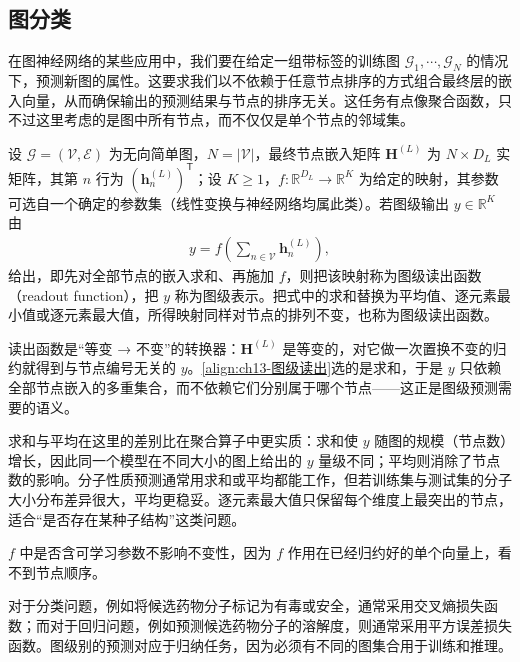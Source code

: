 \documentclass[../../main.tex]{subfiles}
\begin{document}
\subsection{图分类}\label{subsection:ch13-图分类}

在图神经网络的某些应用中，我们要在给定一组带标签的训练图 $\mathcal{G}_1,\cdots,\mathcal{G}_N$ 的情况下，预测新图的属性。这要求我们以不依赖于任意节点排序的方式组合最终层的嵌入向量，从而确保输出的预测结果与节点的排序无关。这任务有点像聚合函数，只不过这里考虑的是图中所有节点，而不仅仅是单个节点的邻域集。

\begin{definition}[图级读出函数]\label{definition:ch13-图级读出}
设 $\mathcal{G}=(\mathcal{V},\mathcal{E})$ 为无向简单图，$N=|\mathcal{V}|$，最终节点嵌入矩阵 $\bm{H}^{(L)}$ 为 $N\times D_L$ 实矩阵，其第 $n$ 行为 $(\bm{h}_n^{(L)})^{\mathsf T}$；设 $K\geqslant1$，$f:\mathbb{R}^{D_L}\to\mathbb{R}^{K}$ 为给定的映射，其参数可选自一个确定的参数集（线性变换与神经网络均属此类）。若图级输出 $y\in\mathbb{R}^{K}$ 由
\begin{align}
y=f\!\left(\sum_{n\in\mathcal{V}}\bm{h}_n^{(L)}\right),
\label{align:ch13-图级读出}
\end{align}
给出，即先对全部节点的嵌入求和、再施加 $f$，则把该映射称为图级读出函数（readout function），把 $y$ 称为图级表示。把式中的求和替换为平均值、逐元素最小值或逐元素最大值，所得映射同样对节点的排列不变，也称为图级读出函数。
\end{definition}

\begin{remark}
读出函数是“等变 → 不变”的转换器：$\bm{H}^{(L)}$ 是等变的，对它做一次置换不变的归约就得到与节点编号无关的 $y$。\eqref{align:ch13-图级读出}选的是求和，于是 $y$ 只依赖全部节点嵌入的多重集合，而不依赖它们分别属于哪个节点——这正是图级预测需要的语义。\par
求和与平均在这里的差别比在聚合算子中更实质：求和使 $y$ 随图的规模（节点数）增长，因此同一个模型在不同大小的图上给出的 $y$ 量级不同；平均则消除了节点数的影响。分子性质预测通常用求和或平均都能工作，但若训练集与测试集的分子大小分布差异很大，平均更稳妥。逐元素最大值只保留每个维度上最突出的节点，适合“是否存在某种子结构”这类问题。\par
$f$ 中是否含可学习参数不影响不变性，因为 $f$ 作用在已经归约好的单个向量上，看不到节点顺序。
\end{remark}

\begin{example}[ 候选药物分子的图分类]\label{example:ch13-药物分子图分类}
对于分类问题，例如将候选药物分子标记为有毒或安全，通常采用交叉熵损失函数；而对于回归问题，例如预测候选药物分子的溶解度，则通常采用平方误差损失函数。图级别的预测对应于归纳任务，因为必须有不同的图集合用于训练和推理。
\end{example}
\end{document}
